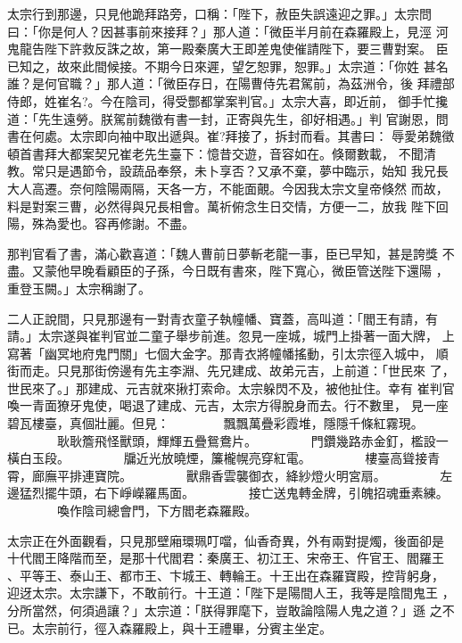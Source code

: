 \begin{pinyinscope}
{太宗行到那邊，只見他跪拜路旁，口稱：「陛下，赦臣失誤遠迎之罪。」太宗問
曰：「你是何人？因甚事前來接拜？」那人道：「微臣半月前在森羅殿上，見涇
河鬼龍告陛下許救反誅之故，第一殿秦廣大王即差鬼使催請陛下，要三曹對案。
臣已知之，故來此間候接。不期今日來遲，望乞恕罪，恕罪。」太宗道：「你姓
甚名誰？是何官職？」那人道：「微臣存日，在陽曹侍先君駕前，為茲洲令，後
拜禮部侍郎，姓崔名?。今在陰司，得受酆都掌案判官。」太宗大喜，即近前，
御手忙攙道：「先生遠勞。朕駕前魏徵有書一封，正寄與先生，卻好相遇。」判
官謝恩，問書在何處。太宗即向袖中取出遞與。崔?拜接了，拆封而看。其書曰：
辱愛弟魏徵頓首書拜大都案契兄崔老先生臺下：憶昔交遊，音容如在。倏爾數載，
不聞清教。常只是遇節令，設蔬品奉祭，未卜享否？又承不棄，夢中臨示，始知
我兄長大人高遷。奈何陰陽兩隔，天各一方，不能面覿。今因我太宗文皇帝倏然
而故，料是對案三曹，必然得與兄長相會。萬祈俯念生日交情，方便一二，放我
陛下回陽，殊為愛也。容再修謝。不盡。

那判官看了書，滿心歡喜道：「魏人曹前日夢斬老龍一事，臣已早知，甚是誇獎
不盡。又蒙他早晚看顧臣的子孫，今日既有書來，陛下寬心，微臣管送陛下還陽
，重登玉闕。」太宗稱謝了。

二人正說間，只見那邊有一對青衣童子執幢幡、寶蓋，高叫道：「閻王有請，有
請。」太宗遂與崔判官並二童子舉步前進。忽見一座城，城門上掛著一面大牌，
上寫著「幽冥地府鬼門關」七個大金字。那青衣將幢幡搖動，引太宗徑入城中，
順街而走。只見那街傍邊有先主李淵、先兄建成、故弟元吉，上前道：「世民來
了，世民來了。」那建成、元吉就來揪打索命。太宗躲閃不及，被他扯住。幸有
崔判官喚一青面獠牙鬼使，喝退了建成、元吉，太宗方得脫身而去。行不數里，
見一座碧瓦樓臺，真個壯麗。但見：
　　　　飄飄萬疊彩霞堆，隱隱千條紅霧現。
　　　　耿耿簷飛怪獸頭，輝輝五疊鴛鴦片。
　　　　門鑽幾路赤金釘，檻設一橫白玉段。
　　　　牖近光放曉煙，簾櫳幌亮穿紅電。
　　　　樓臺高聳接青霄，廊廡平排連寶院。
　　　　獸鼎香雲襲御衣，絳紗燈火明宮扇。
　　　　左邊猛烈擺牛頭，右下崢嶸羅馬面。
　　　　接亡送鬼轉金牌，引魄招魂垂素練。
　　　　喚作陰司總會門，下方閻老森羅殿。

太宗正在外面觀看，只見那壁廂環珮叮噹，仙香奇異，外有兩對提燭，後面卻是
十代閻王降階而至，是那十代閻君：秦廣王、初江王、宋帝王、仵官王、閻羅王
、平等王、泰山王、都市王、卞城王、轉輪王。十王出在森羅寶殿，控背躬身，
迎迓太宗。太宗謙下，不敢前行。十王道：「陛下是陽間人王，我等是陰間鬼王
，分所當然，何須過讓？」太宗道：「朕得罪麾下，豈敢論陰陽人鬼之道？」遜
之不已。太宗前行，徑入森羅殿上，與十王禮畢，分賓主坐定。

}
\end{pinyinscope}
